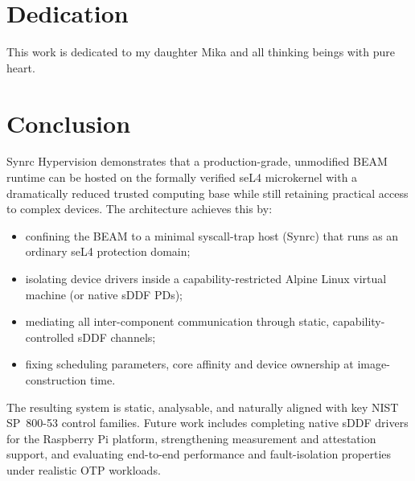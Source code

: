 \documentclass{article}
\begin{document}
\newpage
\section{Dedication}

This work is dedicated to my daughter Mika and all thinking beings with pure heart.

\section{Conclusion}
\label{sec:conclusion}

Synrc Hypervision demonstrates that a production-grade, unmodified BEAM runtime can be hosted on the formally verified seL4
microkernel with a dramatically reduced trusted computing base while still retaining practical access to complex
devices. The architecture achieves this by:

\begin{itemize}
  \item confining the BEAM to a minimal syscall-trap host (Synrc) that runs as an ordinary seL4 protection domain;
  \item isolating device drivers inside a capability-restricted Alpine Linux virtual machine (or native sDDF PDs);
  \item mediating all inter-component communication through static, capability-controlled sDDF channels;
  \item fixing scheduling parameters, core affinity and device ownership at image-construction time.
\end{itemize}

The resulting system is static, analysable, and naturally aligned with key NIST SP~800-53 control families.
Future work includes completing native sDDF drivers for the Raspberry Pi platform, strengthening measurement
and attestation support, and evaluating end-to-end performance and fault-isolation properties under realistic OTP workloads.
\end{document}
